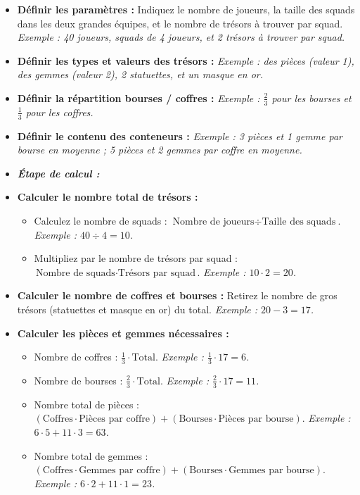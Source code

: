 \documentclass{pirategame}
\begin{document}
\begin{itemize}
  \item \textbf{Définir les paramètres :} Indiquez le nombre de joueurs, la taille des squads dans les deux grandes équipes, et le nombre de trésors à trouver par squad.  
  \textit{Exemple : 40 joueurs, squads de 4 joueurs, et 2 trésors à trouver par squad.}

  \item \textbf{Définir les types et valeurs des trésors :}  
  \textit{Exemple : des pièces (valeur 1), des gemmes (valeur 2), 2 statuettes, et un masque en or.}

  \item \textbf{Définir la répartition bourses / coffres :}  
  \textit{Exemple : \(\frac{2}{3}\) pour les bourses et \(\frac{1}{3}\) pour les coffres.}

  \item \textbf{Définir le contenu des conteneurs :}  
  \textit{Exemple : 3 pièces et 1 gemme par bourse en moyenne ; 5 pièces et 2 gemmes par coffre en moyenne.}

  \item \textbf{\textit{Étape de calcul :}}

  \item \textbf{Calculer le nombre total de trésors :}
  \begin{itemize}
    \item Calculez le nombre de squads : \(\text{Nombre de joueurs} \div \text{Taille des squads}\).  
    \textit{Exemple : \(40 \div 4 = 10\).}
    \item Multipliez par le nombre de trésors par squad : \(\text{Nombre de squads} \cdot \text{Trésors par squad}\).  
    \textit{Exemple : \(10 \cdot 2 = 20\).}
  \end{itemize}

  \item \textbf{Calculer le nombre de coffres et bourses :}  
  Retirez le nombre de gros trésors (statuettes et masque en or) du total.  
  \textit{Exemple : \(20 - 3 = 17\).}

  \item \textbf{Calculer les pièces et gemmes nécessaires :}
  \begin{itemize}
    \item Nombre de coffres : \(\frac{1}{3} \cdot \text{Total}\).  
    \textit{Exemple : \(\frac{1}{3} \cdot 17 = 6\).}
    \item Nombre de bourses : \(\frac{2}{3} \cdot \text{Total}\).  
    \textit{Exemple : \(\frac{2}{3} \cdot 17 = 11\).}
    \item Nombre total de pièces : \((\text{Coffres} \cdot \text{Pièces par coffre}) + (\text{Bourses} \cdot \text{Pièces par bourse})\).  
    \textit{Exemple : \(6 \cdot 5 + 11 \cdot 3 = 63\).}
    \item Nombre total de gemmes : \((\text{Coffres} \cdot \text{Gemmes par coffre}) + (\text{Bourses} \cdot \text{Gemmes par bourse})\).  
    \textit{Exemple : \(6 \cdot 2 + 11 \cdot 1 = 23\).}
  \end{itemize}


\end{itemize}
\end{document}
